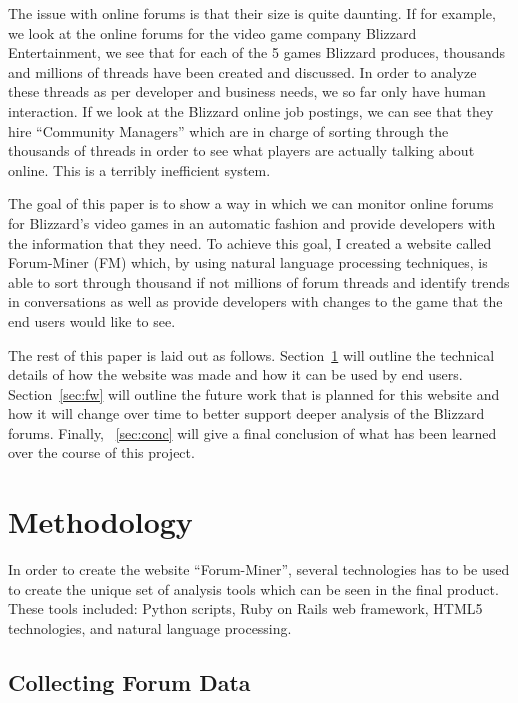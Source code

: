 \documentclass[conference]{IEEEtran}
\begin{document}
The issue with online forums is that their size is quite daunting. If for example, we look at the online
forums for the video game company Blizzard Entertainment, we see that for each of the 5 games Blizzard produces,
thousands and millions of threads have been created and discussed. In order to analyze these threads as
per developer and business needs, we so far only have human interaction. If we look at the Blizzard online
job postings, we can see that they hire ``Community Managers'' which are in charge of sorting through
the thousands of threads in order to see what players are actually talking about online. This is a terribly
inefficient system. 

The goal of this paper is to show a way in which we can monitor online forums for Blizzard's video games
in an automatic fashion and provide developers with the information that they need. To achieve this goal,
I created a website called Forum-Miner (FM) which, by using natural language processing techniques,
is able to sort through thousand if not millions of forum threads and identify trends in conversations
as well as provide developers with changes to the game that the end users would like to see.

The rest of this paper is laid out as follows.  Section~\ref{sec:meth} will outline the technical details
of how the website was made and how it can be used by end users. Section~\ref{sec:fw} will outline
the future work that is planned for this website and how it will change over time to better support
deeper analysis of the Blizzard forums. Finally, ~\ref{sec:conc} will give a final conclusion of what has 
been learned over the course of this project.


\section{Methodology}
\label{sec:meth}

In order to create the website ``Forum-Miner'', several technologies has to be used to create
the unique set of analysis tools which can be seen in the final product. These tools included: Python scripts,
Ruby on Rails web framework, HTML5 technologies, and natural language processing.

\subsection{Collecting Forum Data}
\end{document}
